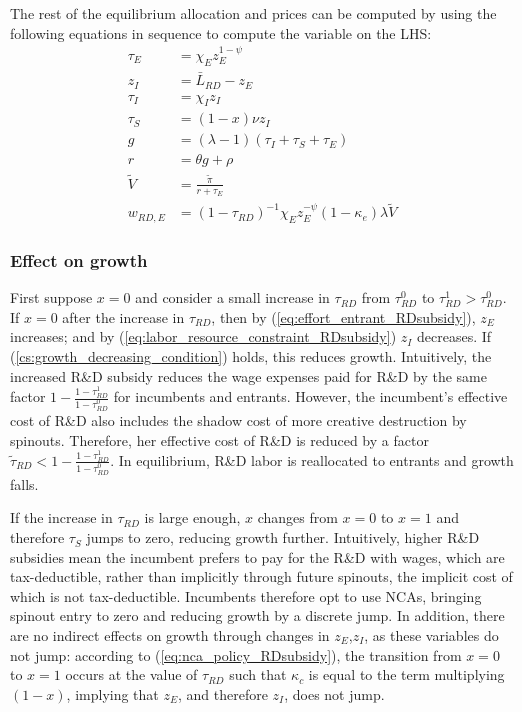 \documentclass[11pt,english]{article}
\theoremstyle{remark}
\begin{document}
The rest of the equilibrium allocation and prices can be computed by using the following equations in sequence to compute the variable on the LHS:
\begin{align}
	\tau_E &= \chi_E z_E^{1-\psi} \\
	z_I &= \bar{L}_{RD} - z_E \label{eq:labor_resource_constraint_RDsubsidy}\\ 
	\tau_I &= \chi_I z_I \\
	\tau_S &= (1-x) \nu z_I \\
	g &= (\lambda - 1) (\tau_I + \tau_S + \tau_E) \\
	r &= \theta g + \rho \\
	\tilde{V} &= \frac{\tilde{\pi}}{r + \tau_E} \\ 
	w_{RD,E} &= (1-\tau_{RD})^{-1}\chi_E z_E^{-\psi} (1-\kappa_e) \lambda \tilde{V} \label{eq:wage_rd_labor_RDsubsidy}
\end{align}

\subsubsection{Effect on growth}

First suppose $x = 0$ and consider a small increase in $\tau_{RD}$ from $\tau_{RD}^0$ to $\tau_{RD}^1 > \tau_{RD}^0$. If $x = 0$ after the increase in $\tau_{RD}$, then by (\ref{eq:effort_entrant_RDsubsidy}), $z_E$ increases; and by (\ref{eq:labor_resource_constraint_RDsubsidy}) $z_I$ decreases. If (\ref{cs:growth_decreasing_condition}) holds, this reduces growth. Intuitively, the increased R\&D subsidy reduces the wage expenses paid for R\&D by the same factor $1-\frac{1-\tau_{RD}^1}{1-\tau_{RD}^0}$ for incumbents and entrants. However, the incumbent's effective cost of R\&D also includes the shadow cost of more creative destruction by spinouts. Therefore, her effective cost of R\&D is reduced by a factor $\tilde{\tau}_{RD} < 1-\frac{1-\tau_{RD}^1}{1-\tau_{RD}^0}$. In equilibrium, R\&D labor is reallocated to entrants and growth falls.

If the increase in $\tau_{RD}$ is large enough, $x$ changes from $x = 0$ to $x = 1$ and therefore $\tau_S$ jumps to zero, reducing growth further. Intuitively, higher R\&D subsidies mean the incumbent prefers to pay for the R\&D with wages, which are tax-deductible, rather than implicitly through future spinouts, the implicit cost of which is not tax-deductible. Incumbents therefore opt to use NCAs, bringing spinout entry to zero and reducing growth by a discrete jump. In addition, there are no indirect effects on growth through changes in $z_E$,$z_I$, as these variables do not jump: according to (\ref{eq:nca_policy_RDsubsidy}), the transition from $x= 0$ to $x =1$ occurs at the value of $\tau_{RD}$ such that $\kappa_c$ is equal to the term multiplying $(1-x)$, implying that $z_E$, and therefore $z_I$, does not jump.
\end{document}
